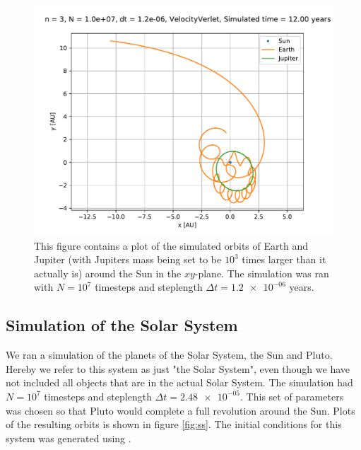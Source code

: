 \documentclass[reprint,english,notitlepage]{revtex4-1}  %
\begin{document}
\begin{figure}[H]
\includegraphics[width=\columnwidth]{../data/figures/sun-earth-jupiter/sej_1000xM_vv_orbit2D.pdf}
\caption{This figure contains a plot of the simulated orbits of Earth and Jupiter (with Jupiters mass being set to be $10^3$ times larger than it actually is) around the Sun in the $xy$-plane. The simulation was ran with $N=10^7$ timesteps and steplength $\Delta t = \num{1.2e-06}$ years.}
\label{fig:sej-1000}
\end{figure}



\subsection{Simulation of the Solar System} \label{sec:IV:f}

We ran a simulation of the planets of the Solar System, the Sun and Pluto. Hereby we refer to this system as just "the Solar System", even though we have not included all objects that are in the actual Solar System. The simulation had $N = 10^7$ timesteps and steplength $\Delta t = \num{2.48e-05}$. This set of parameters was chosen so that Pluto would complete a full revolution around the Sun. Plots of the resulting orbits is shown in figure \ref{fig:ss}. The initial conditions for this system was generated using \citep{NASASolarInit}.
\end{document}
